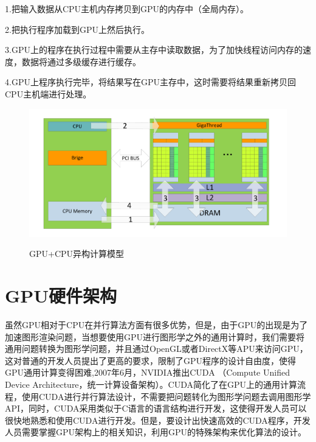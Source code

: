 1.把输入数据从CPU主机内存拷贝到GPU的内存中（全局内存）。

2.把执行程序加载到GPU上然后执行。

3.GPU上的程序在执行过程中需要从主存中读取数据，为了加快线程访问内存的速度，数据将通过多级缓存进行缓存。

4.GPU上程序执行完毕，将结果写在GPU主存中，这时需要将结果重新拷贝回CPU主机端进行处理。
\begin{figure}
\setlength{\belowcaptionskip}{-0.5cm}
  \begin{center}
    {\includegraphics[width=1 \textwidth]{figures/yigou.pdf}}
    \end{center}
  \caption{{\footnotesize{GPU+CPU异构计算模型}}}
  \label{GCY}
\end{figure}
\section{GPU硬件架构}

虽然GPU相对于CPU在并行算法方面有很多优势，但是，由于GPU的出现是为了加速图形渲染问题，当想要使用GPU进行图形学之外的通用计算时，我们需要将通用问题转换为图形学问题，并且通过OpenGL或者DirectX等APU来访问GPU，这对普通的开发人员提出了更高的要求，限制了GPU程序的设计自由度，使得GPU通用计算变得困难,2007年6月，NVIDIA推出CUDA （Compute Unified Device Architecture，统一计算设备架构）\cite{CUDA}。CUDA简化了在GPU上的通用计算流程，使用CUDA进行并行算法设计，不需要把问题转化为图形学问题去调用图形学API，同时，CUDA采用类似于C语言的语言结构进行开发，这使得开发人员可以很快地熟悉和使用CUDA进行开发。但是，要设计出快速高效的CUDA程序，开发人员需要掌握GPU架构上的相关知识，利用GPU的特殊架构来优化算法的设计。

